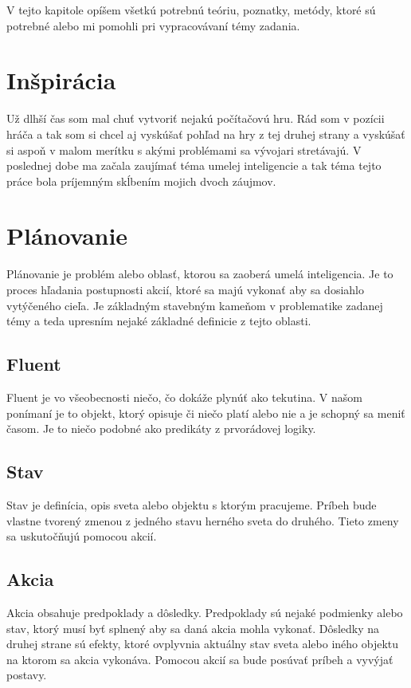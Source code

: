 V tejto kapitole opíšem všetkú potrebnú teóriu, poznatky, metódy, ktoré sú potrebné alebo mi pomohli pri vypracovávaní témy zadania.

\section{Inšpirácia}
Už dlhší čas som mal chuť vytvoriť nejakú počítačovú hru. Rád som v pozícii hráča a tak som si chcel aj vyskúšať pohľad na hry z tej druhej strany a vyskúšať si aspoň v malom merítku s akými problémami sa vývojari stretávajú. V poslednej dobe ma začala zaujímať téma umelej inteligencie a tak téma tejto práce bola príjemným skĺbením mojich dvoch záujmov.

\section{Plánovanie}
Plánovanie je problém alebo oblasť, ktorou sa zaoberá umelá inteligencia. Je to proces hľadania postupnosti akcií, ktoré sa majú vykonať aby sa dosiahlo vytýčeného cieľa. Je základným stavebným kameňom v problematike zadanej témy a teda upresním nejaké základné definicie z tejto oblasti.
\subsection{Fluent}
Fluent je vo všeobecnosti niečo, čo dokáže plynúť ako tekutina\cite{approach}. V našom ponímaní je to objekt, ktorý opisuje či niečo platí alebo nie a je schopný sa meniť časom. Je to niečo podobné ako predikáty z prvorádovej logiky.
\subsection{Stav}
Stav je definícia, opis sveta alebo objektu s ktorým pracujeme. Príbeh bude vlastne tvorený zmenou z jedného stavu herného sveta do druhého. Tieto zmeny sa uskutočňujú pomocou akcií.
\subsection{Akcia}
Akcia obsahuje predpoklady a dôsledky. Predpoklady sú nejaké podmienky alebo stav, ktorý musí byť splnený aby sa daná akcia mohla vykonať. Dôsledky na druhej strane sú efekty, ktoré ovplyvnia aktuálny stav sveta alebo iného objektu na ktorom sa akcia vykonáva. Pomocou akcií sa bude posúvať príbeh a vyvýjať postavy.
